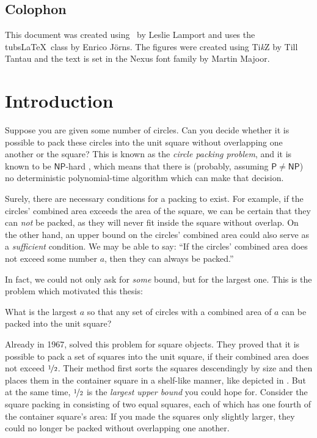 \documentclass[a4paper,style=print,bibliography=totoc,nexus,lnum,extramargin]{tubsbook}
\begin{document}
\section*{Colophon}

This document was created using \LaTeXe\ by Leslie Lamport and uses the tubs\LaTeX\ class by Enrico Jörns. The figures were created using Ti\textit{k}Z by Till Tantau and the text is set in the Nexus font family by Martin Majoor.

\cleardoublepage
\setcounter{tocdepth}{1}

\tableofcontents
\cleardoublepage

\mainmatter

\chapter{Introduction}

Suppose you are given some number of circles. Can you decide whether it is possible to pack these circles into the unit square without overlapping one another or the square? This is known as the \emph{circle packing problem}, and it is known to be $\mathsf{NP}$-hard \cite{DFL2010circle}, which means that there is (probably, assuming $\mathsf{P} \ne \mathsf{NP}$) no deterministic polynomial-time algorithm which can make that decision.


Surely, there are necessary conditions for a packing to exist. For example, if the circles' combined area exceeds the area of the square, we can be certain that they can \emph{not} be packed, as they will never fit inside the square without overlap.
On the other hand, an upper bound on the circles' combined area could also serve as a \emph{sufficient} condition. We may be able to say: “If the circles' combined area does not exceed some number $a$, then they can always be packed.”

In fact, we could not only ask for \emph{some} bound, but for the largest one. This is the problem which motivated this thesis:

\begin{problem}\label{prb:1}
    What is the largest $a$ so that any set of circles with a combined area of $a$ can be packed into the unit square?
\end{problem}

Already in 1967, \textcite{MM1967some} solved this problem for square objects. They proved that it is possible to pack a set of squares into the unit square, if their combined area does not exceed $\nicefrac{1}{2}$. Their method first sorts the squares descendingly by size and then places them in the container square in a shelf-like manner, like depicted in . But at the same time, $\nicefrac{1}{2}$ is the \emph{largest upper bound} you could hope for. Consider the square packing in  consisting of two equal squares, each of which has one fourth of the container square's area: If you made the squares only slightly larger, they could no longer be packed without overlapping one another.
\end{document}
